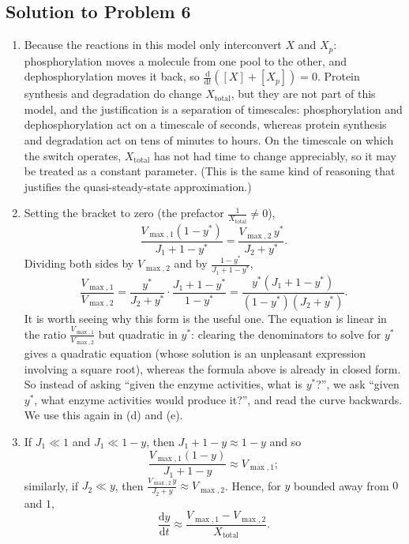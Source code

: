 \documentclass[a4paper,12pt]{article}
\begin{document}
\subsection*{Solution to Problem 6}

\begin{enumerate}[label=(\alph*)]
\item Because the reactions in this model only interconvert $X$ and $X_p$: phosphorylation moves a molecule from one pool to the other, and dephosphorylation moves it back, so $\frac{\text{d}}{\text{d}t}\left( [X]+[X_p] \right) = 0$. Protein synthesis and degradation do change $X_{\text{total}}$, but they are not part of this model, and the justification is a separation of timescales: phosphorylation and dephosphorylation act on a timescale of seconds, whereas protein synthesis and degradation act on tens of minutes to hours. On the timescale on which the switch operates, $X_{\text{total}}$ has not had time to change appreciably, so it may be treated as a constant parameter. (This is the same kind of reasoning that justifies the quasi-steady-state approximation.)

\item Setting the bracket to zero (the prefactor $\frac{1}{X_{\text{total}}} \neq 0$),
\[ \frac{V_{\max,1}(1-y^*)}{J_1+1-y^*} = \frac{V_{\max,2}\, y^*}{J_2+y^*} . \]
Dividing both sides by $V_{\max,2}$ and by $\frac{1-y^*}{J_1+1-y^*}$,
\[ \frac{V_{\max,1}}{V_{\max,2}} = \frac{y^*}{J_2+y^*} \cdot \frac{J_1+1-y^*}{1-y^*} = \frac{y^*\left( J_1+1-y^* \right)}{\left( 1-y^* \right)\left( J_2+y^* \right)} . \]
It is worth seeing why this form is the useful one. The equation is linear in the ratio $\frac{V_{\max,1}}{V_{\max,2}}$ but quadratic in $y^*$: clearing the denominators to solve for $y^*$ gives a quadratic equation (whose solution is an unpleasant expression involving a square root), whereas the formula above is already in closed form. So instead of asking ``given the enzyme activities, what is $y^*$?'', we ask ``given $y^*$, what enzyme activities would produce it?'', and read the curve backwards. We use this again in (d) and (e).

\item If $J_1 \ll 1$ and $J_1 \ll 1-y$, then $J_1+1-y \approx 1-y$ and so
\[ \frac{V_{\max,1}(1-y)}{J_1+1-y} \approx V_{\max,1} ; \]
similarly, if $J_2 \ll y$, then $\frac{V_{\max,2}\,y}{J_2+y} \approx V_{\max,2}$. Hence, for $y$ bounded away from $0$ and $1$,
\[ \frac{\text{d}y}{\text{d}t} \approx \frac{V_{\max,1}-V_{\max,2}}{X_{\text{total}}} . \]


\end{enumerate}
\end{document}
